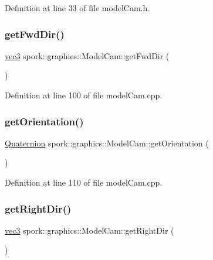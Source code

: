 Definition at line 33 of file model\+Cam.\+h.

\mbox{\label{classspork_1_1graphics_1_1_model_cam_a93058ea250c97b9bcc03b5d3e7f7c127}} 
\subsubsection{\texorpdfstring{get\+Fwd\+Dir()}{getFwdDir()}}
{\footnotesize\ttfamily \hyperlink{structspork_1_1maths_1_1vec3}{vec3} spork\+::graphics\+::\+Model\+Cam\+::get\+Fwd\+Dir (\begin{DoxyParamCaption}{ }\end{DoxyParamCaption})}



Definition at line 100 of file model\+Cam.\+cpp.

\mbox{\label{classspork_1_1graphics_1_1_model_cam_ab852f0da194a83225084c2a7318034fb}} 
\subsubsection{\texorpdfstring{get\+Orientation()}{getOrientation()}}
{\footnotesize\ttfamily \hyperlink{structspork_1_1maths_1_1_quaternion}{Quaternion} spork\+::graphics\+::\+Model\+Cam\+::get\+Orientation (\begin{DoxyParamCaption}{ }\end{DoxyParamCaption})}



Definition at line 110 of file model\+Cam.\+cpp.

\mbox{\label{classspork_1_1graphics_1_1_model_cam_ad9b3a5d537feca1d93b6583a2f894c67}} 
\subsubsection{\texorpdfstring{get\+Right\+Dir()}{getRightDir()}}
{\footnotesize\ttfamily \hyperlink{structspork_1_1maths_1_1vec3}{vec3} spork\+::graphics\+::\+Model\+Cam\+::get\+Right\+Dir (\begin{DoxyParamCaption}{ }\end{DoxyParamCaption})}



